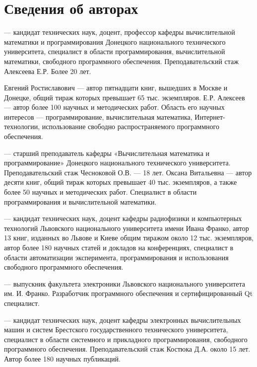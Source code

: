 \chapter{Сведения об авторах}

 --- кандидат технических наук, доцент, профессор кафедры вычислительной математики и
программирования Донецкого национального технического университета, специалист в области программирования,
вычислительной математики, свободного программного обеспечения. Преподавательский стаж Алексеева Е.Р. Более 20 лет.

Евгений Ростиславович --- автор пятнадцати книг, вышедших в Москве и Донецке, общий тираж которых превышает 65 тыс.
экземпляров. Е.Р. Алексеев --- автор более 100 научных и методических работ. Область его научных интересов —
программирование, вычислительная математика, Интернет-технологии, использование свободно распространяемого программного
обеспечения.

 --- старший преподаватель кафедры «Вычислительная математика и программирование» Донецкого
национального технического университета. Преподавательский стаж Чесноковой О.В. --- 18 лет. Оксана Витальевна --- автор
десяти книг, общий тираж которых превышает 40 тыс. экземпляров, а также более 50 научных и методических работ.
Специалист в области программирования и вычислительной математики.


 --- кандидат технических наук, доцент кафедры радиофизики и компьютерных технологий Львовского
национального университета имени Ивана Франко, автор 13 книг, изданных во Львове и Киеве общим тиражом около 12 тыс.
экземпляров, автор более 180 научных статей и докладов на конференциях, специалист в области автоматизации
эксперимента, программирования и использования свободного программного обеспечения.


 --- выпускник факультета электроники Львовского национального университета им. И. Франко.
Разработчик программного обеспечения и сертифицированный Qt специалист.


 --- кандидат технических наук, доцент кафедры электронных вычислительных машин и систем
Брестского государственного технического университета, специалист в области системного и прикладного программирования,
свободного программного обеспечения. Преподавательский стаж Костюка Д.А. около 15 лет. Автор более 180 научных
публикаций.
